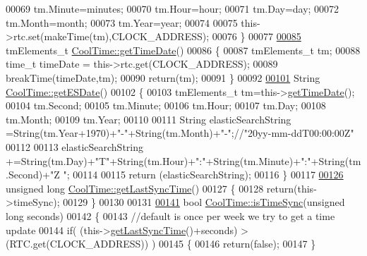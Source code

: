 \begin{DoxyCode}
00069     tm.Minute=minutes; 
00070     tm.Hour=hour; 
00071     tm.Day=day;
00072     tm.Month=month; 
00073     tm.Year=year;   
00074 
00075     this->rtc.set(makeTime(tm),CLOCK\_ADDRESS);
00076 \}
00077 
\hyperlink{class_cool_time_a7a7501c5ca77dd1248bea704c44f986c}{00085} tmElements\_t \hyperlink{class_cool_time_a7a7501c5ca77dd1248bea704c44f986c}{CoolTime::getTimeDate}()
00086 \{   
00087     tmElements\_t tm;
00088     time\_t timeDate = this->rtc.get(CLOCK\_ADDRESS);
00089     breakTime(timeDate,tm);
00090     \textcolor{keywordflow}{return}(tm);
00091 \}
00092 
\hyperlink{class_cool_time_ac4f32ee513c1328d984306645e8785a4}{00101} String \hyperlink{class_cool_time_ac4f32ee513c1328d984306645e8785a4}{CoolTime::getESDate}()
00102 \{
00103     tmElements\_t tm=this->\hyperlink{class_cool_time_a7a7501c5ca77dd1248bea704c44f986c}{getTimeDate}();
00104     tm.Second; 
00105     tm.Minute; 
00106     tm.Hour; 
00107     tm.Day;
00108     tm.Month; 
00109     tm.Year; 
00110     
00111     String elasticSearchString =String(tm.Year+1970)+\textcolor{stringliteral}{"-"}+String(tm.Month)+\textcolor{stringliteral}{"-"};\textcolor{comment}{//"20yy-mm-ddT00:00:00Z"}
00112 
00113     elasticSearchString +=String(tm.Day)+\textcolor{stringliteral}{"T"}+String(tm.Hour)+\textcolor{stringliteral}{":"}+String(tm.Minute)+\textcolor{stringliteral}{":"}+String(tm.Second)+\textcolor{stringliteral}{"Z
      "};
00114     
00115     \textcolor{keywordflow}{return} (elasticSearchString);
00116 \}
00117 
\hyperlink{class_cool_time_a5d17f707a9d337720493b2bce9d41c21}{00126} \textcolor{keywordtype}{unsigned} \textcolor{keywordtype}{long} \hyperlink{class_cool_time_a5d17f707a9d337720493b2bce9d41c21}{CoolTime::getLastSyncTime}()
00127 \{
00128     \textcolor{keywordflow}{return}(this->timeSync);
00129 \}
00130 
00131 
\hyperlink{class_cool_time_a5ae038a4498602b189f76a10bf02adf8}{00141} \textcolor{keywordtype}{bool} \hyperlink{class_cool_time_a5ae038a4498602b189f76a10bf02adf8}{CoolTime::isTimeSync}(\textcolor{keywordtype}{unsigned} \textcolor{keywordtype}{long} seconds)
00142 \{
00143 \textcolor{comment}{//default is once per week we try to get a time update}
00144     \textcolor{keywordflow}{if}( (this->\hyperlink{class_cool_time_a5d17f707a9d337720493b2bce9d41c21}{getLastSyncTime}()+seconds) > (RTC.get(CLOCK\_ADDRESS)) ) 
00145     \{
00146         \textcolor{keywordflow}{return}(\textcolor{keyword}{false});  
00147     \}

\end{DoxyCode}
